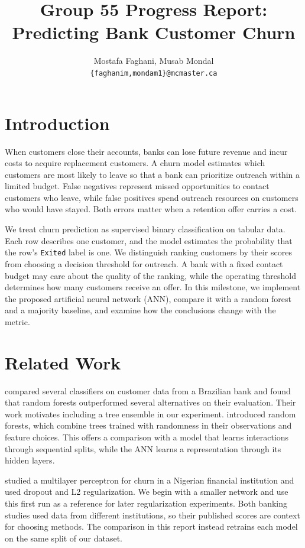 \documentclass[11pt]{article}
\title{Group 55 Progress Report:\\Predicting Bank Customer Churn}
\author{Mostafa Faghani, Musab Mondal\\
  \texttt{\{faghanim,mondam1\}@mcmaster.ca}}
\begin{document}
\maketitle

\section{Introduction}

When customers close their accounts, banks can lose future revenue and incur costs to acquire replacement customers. A churn model estimates which customers are most likely to leave so that a bank can prioritize outreach within a limited budget. False negatives represent missed opportunities to contact customers who leave, while false positives spend outreach resources on customers who would have stayed. Both errors matter when a retention offer carries a cost.

We treat churn prediction as supervised binary classification on tabular data. Each row describes one customer, and the model estimates the probability that the row's \texttt{Exited} label is one. We distinguish ranking customers by their scores from choosing a decision threshold for outreach. A bank with a fixed contact budget may care about the quality of the ranking, while the operating threshold determines how many customers receive an offer. In this milestone, we implement the proposed artificial neural network (ANN), compare it with a random forest and a majority baseline, and examine how the conclusions change with the metric.

\section{Related Work}

\citet{lemos2022} compared several classifiers on customer data from a Brazilian bank and found that random forests outperformed several alternatives on their evaluation. Their work motivates including a tree ensemble in our experiment. \citet{breiman2001} introduced random forests, which combine trees trained with randomness in their observations and feature choices. This offers a comparison with a model that learns interactions through sequential splits, while the ANN learns a representation through its hidden layers.

\citet{amuda2019} studied a multilayer perceptron for churn in a Nigerian financial institution and used dropout and L2 regularization. We begin with a smaller network and use this first run as a reference for later regularization experiments. Both banking studies used data from different institutions, so their published scores are context for choosing methods. The comparison in this report instead retrains each model on the same split of our dataset.
\end{document}
